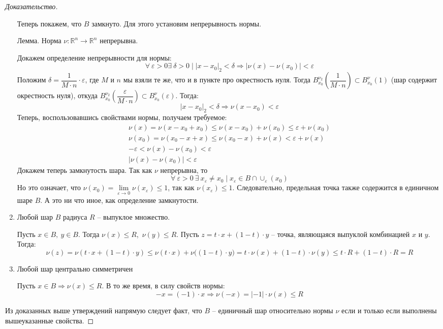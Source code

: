 \documentclass[12pt]{article}
\theoremstyle{definition}
\numberwithin{equation}{section}
\begin{document}
\begin{proof}[Доказательство]
\begin{enumerate}
			Теперь покажем, что $B$ замкнуто. Для этого установим непрерывность нормы.
			
			$\textbf{Лемма}$. Норма $\nu : \mathbb{R}^n \to \mathbb{R}^n$ непрерывна.
			
			Докажем определение непрерывности для нормы: 
			\[\forall\ \varepsilon > 0 \exists\ \delta > 0 \mid |x - x_0|_2 < \delta \Rightarrow |\nu(x) - \nu(x_0)| < \varepsilon\]
			Положим $\delta = \dfrac{1}{M \cdot n} \cdot \varepsilon$, где $M$ и $n$ мы взяли те же, что и в пункте про окрестность нуля. Тогда $B_{x_0}^{\nu_2}\left(\dfrac{1}{M \cdot n}\right) \subset B_{x_0}^{\nu}(1)$ (шар содержит окрестность нуля), откуда $B_{x_0}^{\nu_2}\left(\dfrac{\varepsilon}{M \cdot n}\right) \subset B_{x_0}^{\nu}(\varepsilon)$. Тогда:
			\[|x - x_0|_2 < \delta \Longrightarrow \nu(x - x_0) < \varepsilon\]
			Теперь, воспользовавшись свойствами нормы, получаем требуемое:
			\begin{gather*}
				\nu(x) = \nu(x - x_0 + x_0) \leqslant \nu(x - x_0) + \nu(x_0) \leqslant \varepsilon + \nu(x_0)\\
				\nu(x_0) = \nu(x_0 - x + x) \leqslant \nu(x_0 - x) + \nu(x) < \varepsilon + \nu(x)\\
				-\varepsilon < \nu(x) - \nu(x_0) < \varepsilon \\
				|\nu(x) - \nu(x_0)| < \varepsilon
			\end{gather*}
			Докажем теперь замкнутость шара. Так как $\nu$ непрерывна, то 
			\[\forall\ \varepsilon > 0\ \exists\ x_\varepsilon \neq x_0 \mid x_\varepsilon \in B \cap \cup_\varepsilon(x_0)\]
			Но это означает, что $\nu(x_0) = \displaystyle\lim\limits_{\varepsilon \to 0} \nu(x_\varepsilon) \leqslant 1$, так как $\nu(x_\varepsilon) \leqslant 1$. Следовательно, предельная точка также содержится в единичном шаре $B$.  А это ни что иное, как определение замкнутости.
			\item Любой шар $B$ радиуса $R$ -- выпуклое множество.
			
			Пусть $x \in B,\ y \in B$. Тогда $\nu(x) \leqslant R$,\ $\nu(y) \leqslant R$. Пусть $z = t \cdot x + (1 - t) \cdot y$ -- точка, являющаяся выпуклой комбинацией $x$ и $y$. Тогда:
			\[\nu(z) = \nu(t \cdot x + (1 - t) \cdot y) \leqslant \nu(t \cdot x) + \nu\big((1 - t) \cdot y\big) = t \cdot \nu (x) + (1 - t) \cdot \nu(y) \leqslant t \cdot R + (1 - t) \cdot R = R\]
			
			\item Любой шар центрально симметричен
			
			Пусть $x \in B \Rightarrow \nu(x) \leqslant R$. В то же время, в силу свойств нормы:
			\[-x = (-1) \cdot x \Rightarrow \nu(-x) = |-1| \cdot \nu(x) \leqslant R\] 
				
			\end{enumerate}
			
			Из доказанных выше утверждений напрямую следует факт, что $B$ -- единичный шар относительно нормы $\nu$ если и только если выполнены вышеуказанные свойства.
		
	\end{proof}
\end{document}
